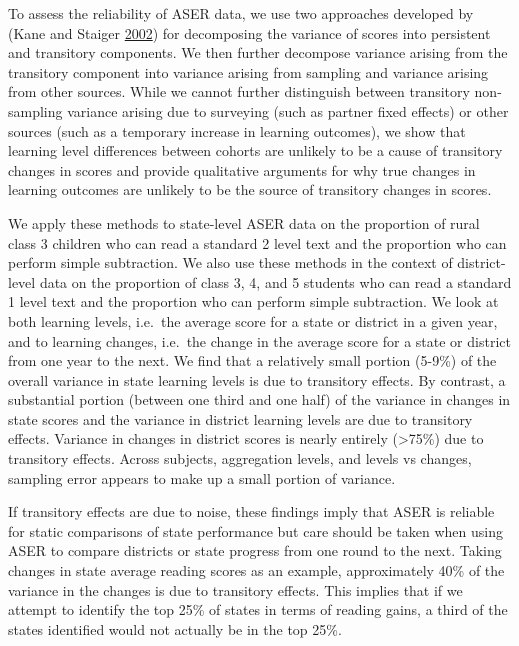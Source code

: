 \documentclass[
  11pt,
]{article}
\begin{document}
To assess the reliability of ASER data, we use two approaches developed by (Kane and Staiger \protect\hyperlink{ref-kane2002promise}{2002}) for decomposing the variance of scores into persistent and transitory components. We then further decompose variance arising from the transitory component into variance arising from sampling and variance arising from other sources. While we cannot further distinguish between transitory non-sampling variance arising due to surveying (such as partner fixed effects) or other sources (such as a temporary increase in learning outcomes), we show that learning level differences between cohorts are unlikely to be a cause of transitory changes in scores and provide qualitative arguments for why true changes in learning outcomes are unlikely to be the source of transitory changes in scores.

We apply these methods to state-level ASER data on the proportion of rural class 3 children who can read a standard 2 level text and the proportion who can perform simple subtraction. We also use these methods in the context of district-level data on the proportion of class 3, 4, and 5 students who can read a standard 1 level text and the proportion who can perform simple subtraction. We look at both learning levels, i.e.~the average score for a state or district in a given year, and to learning changes, i.e.~the change in the average score for a state or district from one year to the next. We find that a relatively small portion (5-9\%) of the overall variance in state learning levels is due to transitory effects. By contrast, a substantial portion (between one third and one half) of the variance in changes in state scores and the variance in district learning levels are due to transitory effects. Variance in changes in district scores is nearly entirely (\textgreater75\%) due to transitory effects. Across subjects, aggregation levels, and levels vs changes, sampling error appears to make up a small portion of variance.

If transitory effects are due to noise, these findings imply that ASER is reliable for static comparisons of state performance but care should be taken when using ASER to compare districts or state progress from one round to the next. Taking changes in state average reading scores as an example, approximately 40\% of the variance in the changes is due to transitory effects. This implies that if we attempt to identify the top 25\% of states in terms of reading gains, a third of the states identified would not actually be in the top 25\%.
\end{document}
